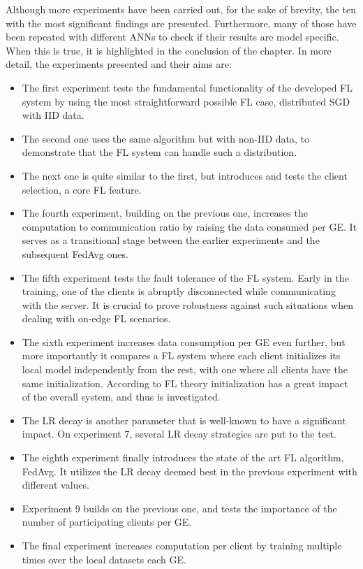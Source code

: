 Although more experiments have been carried out, for the sake of brevity, the ten with the most significant findings are presented. Furthermore, many of those have been repeated with different ANNs to check if their results are model specific. When this is true, it is highlighted in the conclusion of the chapter. In more detail, the experiments presented and their aims are:
\begin{itemize}
    \item The first experiment tests the fundamental functionality of the developed FL system by using the most straightforward possible FL case, distributed SGD with IID data.
    \item The second one uses the same algorithm but with non-IID data, to demonstrate that the FL system can handle such a distribution.
    \item The next one is quite similar to the first, but introduces and tests the client selection, a core FL feature.
    \item The fourth experiment, building on the previous one, increases the computation to communication ratio by raising the data consumed per GE. It serves as a transitional stage between the earlier experiments and the subsequent FedAvg ones.
    \item The fifth experiment tests the fault tolerance of the FL system. Early in the training, one of the clients is abruptly disconnected while communicating with the server. It is crucial to prove robustness against such situations when dealing with on-edge FL scenarios.
    \item The sixth experiment increases data consumption per GE even further, but more importantly it compares a FL system where each client initializes its local model independently from the rest, with one where all clients have the same initialization. According to FL theory initialization has a great impact of the overall system, and thus is investigated.
    \item The LR decay is another parameter that is well-known to have a significant impact. On experiment 7, several LR decay strategies are put to the test.
    \item The eighth experiment finally introduces the state of the art FL algorithm, FedAvg. It utilizes the LR decay deemed best in the previous experiment with different values.
    \item Experiment 9 builds on the previous one, and tests the importance of the number of participating clients per GE.
    \item The final experiment increases computation per client by training multiple times over the local datasets each GE.
\end{itemize}

